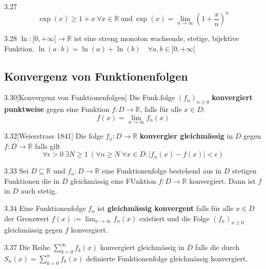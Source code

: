 \documentclass[8pt,a4paper,twocolumn,table]{extarticle}
\newcommand{\R}{\mathbb{R}}
\begin{document}
\begin{korollar}{3.27}
    \[
        \exp(x) \ge 1 + x\ \forall x \in \R\ \mbox{und}\
        \exp(x) = \lim_{n \to \infty} \left( 1 + \frac{x}{n} \right)^n \]
\end{korollar}

\begin{korollar}{3.28}
    $\ln: ]0,+\infty[ \to \R$ ist eine streng monoton wachsende, stetige, bijektive Funktion.
            $\ln(a \cdot b) = \ln(a) + \ln(b)\quad \forall a,b \in ]0,+\infty[$
\end{korollar}

\subsection{Konvergenz von Funktionenfolgen}
\begin{definition}{3.30}[Konvergenz von Funktionenfolgen]
    Die Funk.folge $(f_n)_{n \ge 0}$ \textbf{konvergiert punktweise} gegen eine Funktion $f: D \to \R$, falls für alle $x \in D$:
    \[ f(x) = \lim_{n \to \infty} f_n(x) \]
\end{definition}

\begin{definition}{3.32}[Weierstrass 1841]
    Die folge $f_n: D \to \R$ \textbf{konvergier gleichmässig} in $D$ gegen $f: D \to \R$ falls gilt
    \[ \forall \epsilon > 0\ \exists N \ge 1\ (\forall n \ge N\ \forall x \in D : |f_n(x) - f(x)| < \epsilon ) \]
\end{definition}

\begin{satz}{3.33}
    Sei $D \subseteq \R$ und $f_n : D \to \R$ eine Funktionenfolge bestehend aus in $D$ stetigen Funktionen die in $D$ gleichmässig eine FUnktion $f: D \to \R$ konvergiert.
    Dann ist $f$ in $D$ auch stetig.
\end{satz}

\begin{definition}{3.34}
    Eine Funktionenfolge $f_n$ ist \textbf{gleichmässig konvergent} falls für alle $x \in D$ der Grenzwert $f(x) := \lim_{n \to \infty} f_n(x)$
    existiert und die Folge $(f_n)_{n \ge 0}$ gleichmässig gegen $f$ konvergiert.
\end{definition}

\begin{definition}{3.37}
    Die Reihe $\sum_{k=0}^\infty f_k(x)$ konvergiert gleichmässig in $D$ falls die durch $S_n(x) = \sum_{k=0}^n f_k(x)$ definierte
    Funktionenfolge gleichmässig konvergiert.
\end{definition}
\end{document}
